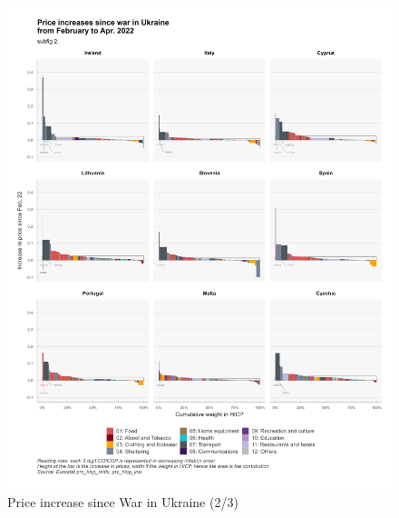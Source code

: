 \documentclass[
  9pt,
  a4paper,
  DIV=11,
  numbers=noendperiod,
  oneside]{scrartcl}
\begin{document}
\begin{figure}

\caption{Price increase since War in Ukraine (2/3)}

{\centering \includegraphics[width=16cm,height=\textheight]{../svg/depuis_wiu_2.png}

}

\end{figure}
\end{document}
